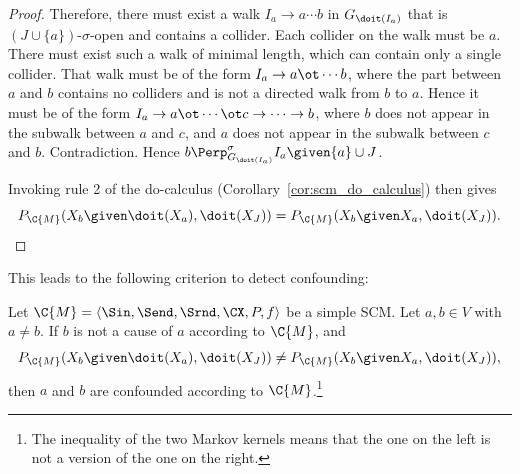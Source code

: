 \begin{proof}
Therefore, there must exist a walk $I_a \to a \cdots b$ in $G_{\doit(I_a)}$ that is $(J \cup \{a\})$-$\sigma$-open and contains a collider. 
Each collider on the walk must be $a$. 
There must exist such a walk of minimal length, which can contain only a single collider.
That walk must be of the form %
$I_a \to a \ot \cdots b$,
where the part between $a$ and $b$ contains no colliders and is not a directed walk from $b$ to $a$. 
Hence it must be of the form
$I_a \to a \ot \cdots \ot c \to \cdots \to b$, where $b$ does not appear in the subwalk between
$a$ and $c$, and $a$ does not appear in the subwalk between $c$ and $b$.
Contradiction.
Hence $b \Perp^\sigma_{G_{\doit(I_a)}} I_a \given \{a\} \cup J$.

Invoking rule 2 of the do-calculus (Corollary~\ref{cor:scm_do_calculus}) then gives 
  $$P_{\C{M}}(X_b \given \doit(X_a), \doit(X_J)) = P_{\C{M}}(X_b \given X_a, \doit(X_J)).$$
\end{proof}
This leads to the following criterion to detect confounding:
\begin{Cor}\label{cor:scm_identify_confounder}
Let $\C{M} = \langle \Sin, \Send, \Srnd, \CX, P, f \rangle$ be a simple SCM.
Let $a, b \in V$ with $a \ne b$.
If $b$ is not a cause of $a$ according to $\C{M}$, and
  $$P_{\C{M}}(X_b \given \doit(X_a), \doit(X_J)) \ne P_{\C{M}}(X_b \given X_a, \doit(X_J)),$$
  then $a$ and $b$ are confounded according to $\C{M}$.\footnote{The inequality of the two Markov kernels means that the one on the left is not a version of the one on the right.}

\end{Cor}
